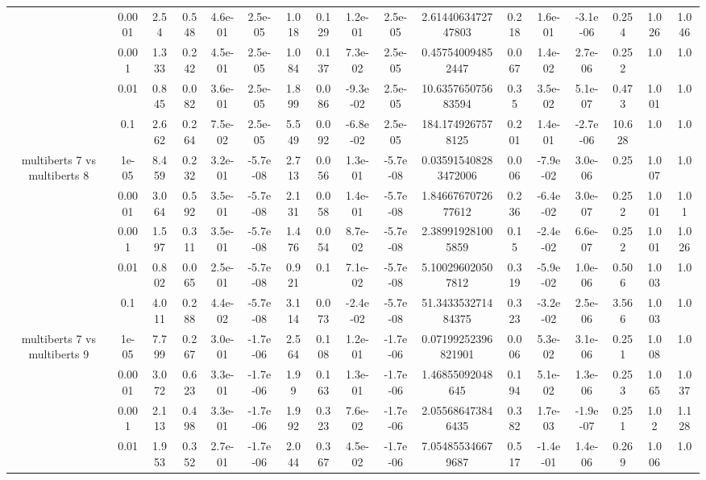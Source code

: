 \begin{tabular}{|c|c|c|c|c|c|c|c|c|c|c|c|c|c|c|c|c|}
 & 0.0001 & 2.54 & 0.548 & 4.6e-01 & 2.5e-05 & 1.018 & 0.129 & 1.2e-01 & 2.5e-05 & 2.6144063472747803 & 0.218 & 1.6e-01 & -3.1e-06 & 0.254 & 1.026 & 1.046 \\
 & 0.001 & 1.333 & 0.242 & 4.5e-01 & 2.5e-05 & 1.084 & 0.137 & 7.3e-02 & 2.5e-05 & 0.457540094852447 & 0.067 & 1.4e-02 & 2.7e-06 & 0.252 & 1.0 & 1.0 \\
 & 0.01 & 0.845 & 0.082 & 3.6e-01 & 2.5e-05 & 1.899 & 0.086 & -9.3e-02 & 2.5e-05 & 10.635765075683594 & 0.35 & 3.5e-02 & 5.1e-07 & 0.473 & 1.001 & 1.0 \\
 & 0.1 & 2.662 & 0.264 & 7.5e-02 & 2.5e-05 & 5.549 & 0.092 & -6.8e-02 & 2.5e-05 & 184.1749267578125 & 0.201 & 1.4e-01 & -2.7e-06 & 10.628 & 1.0 & 1.0 \\
\hline
\multirow{5}{*}{multiberts 7 vs multiberts 8} & 1e-05 & 8.459 & 0.232 & 3.2e-01 & -5.7e-08 & 2.713 & 0.056 & 1.3e-01 & -5.7e-08 & 0.035915408283472006 & 0.006 & -7.9e-02 & 3.0e-06 & 0.25 & 1.007 & 1.0 \\
 & 0.0001 & 3.064 & 0.592 & 3.5e-01 & -5.7e-08 & 2.131 & 0.058 & 1.4e-01 & -5.7e-08 & 1.8466767072677612 & 0.236 & -6.4e-02 & 3.0e-07 & 0.252 & 1.001 & 1.01 \\
 & 0.001 & 1.597 & 0.311 & 3.5e-01 & -5.7e-08 & 1.476 & 0.054 & 8.7e-02 & -5.7e-08 & 2.389919281005859 & 0.15 & -2.4e-02 & 6.6e-07 & 0.252 & 1.001 & 1.026 \\
 & 0.01 & 0.802 & 0.065 & 2.5e-01 & -5.7e-08 & 0.921 & 0.1 & 7.1e-02 & -5.7e-08 & 5.100296020507812 & 0.319 & -5.9e-02 & 1.0e-06 & 0.506 & 1.003 & 1.0 \\
 & 0.1 & 4.011 & 0.288 & 4.4e-02 & -5.7e-08 & 3.114 & 0.073 & -2.4e-02 & -5.7e-08 & 51.343353271484375 & 0.323 & -3.2e-02 & 2.5e-06 & 3.566 & 1.003 & 1.0 \\
\hline
\multirow{5}{*}{multiberts 7 vs multiberts 9} & 1e-05 & 7.799 & 0.267 & 3.0e-01 & -1.7e-06 & 2.564 & 0.108 & 1.2e-01 & -1.7e-06 & 0.07199252396821901 & 0.006 & 5.3e-02 & 3.1e-06 & 0.251 & 1.008 & 1.0 \\
 & 0.0001 & 3.072 & 0.623 & 3.3e-01 & -1.7e-06 & 1.99 & 0.163 & 1.3e-01 & -1.7e-06 & 1.46855092048645 & 0.194 & 5.1e-02 & 1.3e-06 & 0.253 & 1.065 & 1.037 \\
 & 0.001 & 2.113 & 0.498 & 3.3e-01 & -1.7e-06 & 1.992 & 0.323 & 7.6e-02 & -1.7e-06 & 2.055686473846435 & 0.382 & 1.7e-03 & -1.9e-07 & 0.251 & 1.02 & 1.128 \\
 & 0.01 & 1.953 & 0.352 & 2.7e-01 & -1.7e-06 & 2.044 & 0.367 & 4.5e-02 & -1.7e-06 & 7.054855346679687 & 0.517 & -1.4e-01 & 1.4e-06 & 0.269 & 1.006 & 1.0 \\

\end{tabular}
